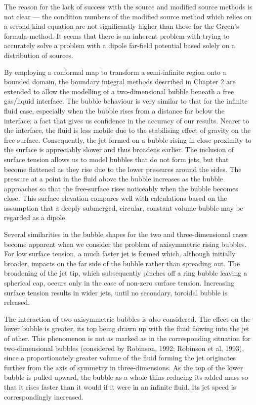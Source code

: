 The reason for the lack of success with the source and modified source methods
is not clear --- the condition numbers of the modified source method
which relies on a second-kind equation are not significantly higher
than those for the Green's formula method. 
It seems that there is an inherent problem with trying to accurately solve a 
problem with a dipole far-field potential based solely 
on a distribution of sources.

By employing a conformal map to transform a semi-infinite region onto a 
bounded domain, the boundary integral methods described in Chapter 2 are
extended to allow the modelling of a two-dimensional bubble beneath a free
gas/liquid interface. The bubble behaviour is very similar to that
for the infinite fluid case, especially when the 
bubble rises from a distance far below the interface; a fact that gives us 
confidence in the accuracy of our results. 
Nearer to the interface, the fluid is less mobile due to the stabilising effect
of gravity on the free-surface.
Consequently, the jet formed on a bubble rising in
close proximity to the surface is appreciably slower and thus broadens earlier.
The inclusion of surface tension allows us to model bubbles that do not
form jets, but that become flattened as they rise due to the lower pressures 
around the sides. The pressure at a point in the fluid above the bubble
increases as the bubble approaches so that the free-surface
rises noticeably when the bubble becomes close. This surface elevation
compares well with calculations based on the assumption 
that a deeply submerged, circular, constant volume bubble may 
be regarded as a dipole.

Several similarities in the bubble shapes for the two and three-dimensional cases
become apparent when we consider the problem of axisymmetric rising bubbles.
For low surface tension, a much faster jet is formed which,
although initially broader,
impacts on the far side of the bubble rather than spreading out.
The broadening of the jet tip, which subsequently pinches off a ring bubble
leaving a spherical cap, occurs only in the case of non-zero 
surface tension. Increasing surface
tension results in wider jets, until no secondary, toroidal bubble 
is released. 

The interaction of two axisymmetric bubbles
is also considered. The effect on the 
lower bubble is greater, its top being drawn up with the fluid 
flowing into the jet of other. This phenomenon is not as 
marked as in the corresponding 
situation for two-dimensional bubbles
(considered by Robinson, 1992; Robinson et al, 1993),
since a proportionately greater volume
of the fluid forming the jet originates further from the axis of symmetry
in three-dimensions.
As the top of the lower bubble is pulled upward, the bubble as a whole thins
reducing its added mass so that it rises faster than it 
would if it were in an infinite fluid. Its jet speed is correspondingly 
increased.

